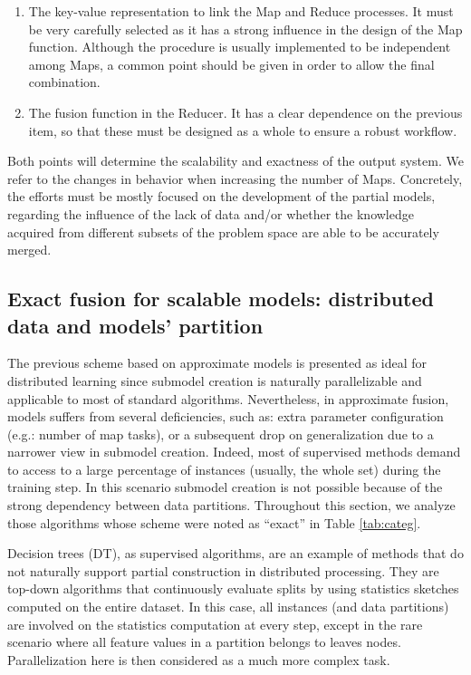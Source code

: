\documentclass[3p,review]{elsarticle}
\begin{document}
	\begin{enumerate}
		\item The key-value representation to link the Map and Reduce processes. It must be very carefully selected as it has a strong influence in the design of the Map function. Although the procedure is usually implemented to be independent among Maps, a common point should be given in order to allow the final combination. 
		
		\item The fusion function in the Reducer. It has a clear dependence on the previous item, so that these must be designed as a whole to ensure a robust workflow.
		
	\end{enumerate}
	
	Both points will determine the scalability and exactness of the output system. We refer to the changes in behavior when increasing the number of Maps. Concretely, the efforts must be mostly focused on the development of the partial models, regarding the influence of the lack of data and/or whether the knowledge acquired from different subsets of the problem space are able to be accurately merged.
	
	\subsection{Exact fusion for scalable models: distributed data and models' partition}\label{subsec:exact}
	
	The previous scheme based on approximate models is presented as ideal for distributed learning since submodel creation is naturally parallelizable and applicable to most of standard algorithms. Nevertheless, in approximate fusion, models suffers from several deficiencies, such as: extra parameter configuration (e.g.: number of map tasks), or a subsequent drop on generalization due to a narrower view in submodel creation. Indeed, most of supervised methods demand to access to a large percentage of instances (usually, the whole set) during the training step. In this scenario submodel creation is not possible because of the strong dependency between data partitions. Throughout this section, we analyze those algorithms whose scheme were noted as ``exact'' in Table \ref{tab:categ}.
	
	Decision trees (DT), as supervised algorithms, are an example of methods that do not naturally support partial construction in distributed processing. They are top-down algorithms that continuously evaluate splits by using statistics sketches computed on the entire dataset. In this case, all instances (and data partitions) are involved on the statistics computation at every step, except in the rare scenario where all feature values in a partition belongs to leaves nodes. Parallelization here is then considered as a much more complex task.
	
\end{document}
